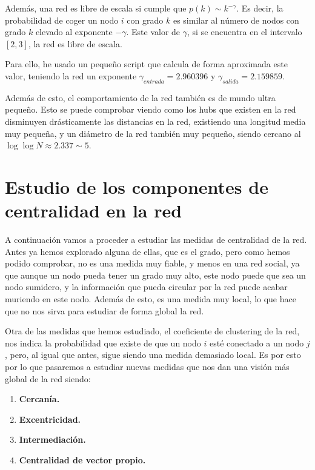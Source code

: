 \documentclass[paper=a4, fontsize=11pt]{article} %
\numberwithin{equation}{section} %
\numberwithin{figure}{section} %
\numberwithin{table}{section} %
\begin{document}
Además, una red es libre de escala si cumple que $p(k) \sim k^{-\gamma}$. Es decir, la probabilidad de coger un nodo $i$ con grado $k$ es similar al número de nodos con grado $k$ elevado al exponente $-\gamma$. Este valor de $\gamma$, si se encuentra en el intervalo $[2,3]$, la red es libre de escala.

Para ello, he usado un pequeño script que calcula de forma aproximada este valor, teniendo la red un exponente $\gamma_{entrada} = 2.960396$ y $\gamma_{salida} =  2.159859$.

Además de esto, el comportamiento de la red también es de mundo ultra pequeño. Esto se puede comprobar viendo como los hubs que existen en la red disminuyen drásticamente las distancias en la red, existiendo una longitud media muy pequeña, y un diámetro de la red también muy pequeño, siendo cercano al $\log\log N \approx 2.337 \sim 5$.

\section{Estudio de los componentes de centralidad en la red}

A continuación vamos a proceder a estudiar las medidas de centralidad de la red. Antes ya hemos explorado alguna de ellas, que es el grado, pero como hemos podido comprobar, no es una medida muy fiable, y menos en una red social, ya que aunque un nodo pueda tener un grado muy alto, este nodo puede que sea un nodo sumidero, y la información que pueda circular por la red puede acabar muriendo en este nodo. Además de esto, es una medida muy local, lo que hace que no nos sirva para estudiar de forma global la red.

Otra de las medidas que hemos estudiado, el coeficiente de clustering de la red, nos indica la probabilidad que existe de que un nodo $i$ esté conectado a un nodo $j$, pero, al igual que antes, sigue siendo una medida demasiado local. Es por esto por lo que pasaremos a estudiar nuevas medidas que nos dan una visión más global de la red siendo:

\begin{enumerate}[$\bullet$]
\item \textbf{Cercanía.}
\item \textbf{Excentricidad.}
\item \textbf{Intermediación.}
\item \textbf{Centralidad de vector propio.}
\end{enumerate}
\end{document}
